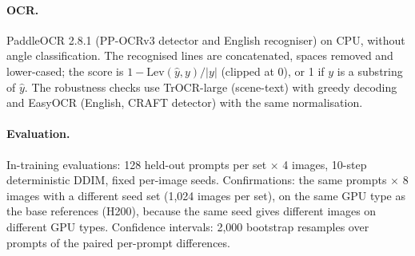 \documentclass{article}
\begin{document}
\paragraph{OCR.} PaddleOCR 2.8.1 (PP-OCRv3 detector and English recogniser) on CPU, without angle classification. The
recognised lines are concatenated, spaces removed and lower-cased; the score is $1-\mathrm{Lev}(\hat y,y)/|y|$ (clipped at 0),
or 1 if $y$ is a substring of $\hat y$. The robustness checks use TrOCR-large (scene-text) with greedy decoding and EasyOCR
(English, CRAFT detector) with the same normalisation.

\paragraph{Evaluation.} In-training evaluations: 128 held-out prompts per set $\times$ 4 images, 10-step deterministic DDIM,
fixed per-image seeds. Confirmations: the same prompts $\times$ 8 images with a different seed set (1{,}024 images per set), on the
same GPU type as the base references (H200), because the same seed gives different images on different GPU types. Confidence
intervals: 2{,}000 bootstrap resamples over prompts of the paired per-prompt differences.

\newpage

\end{document}
